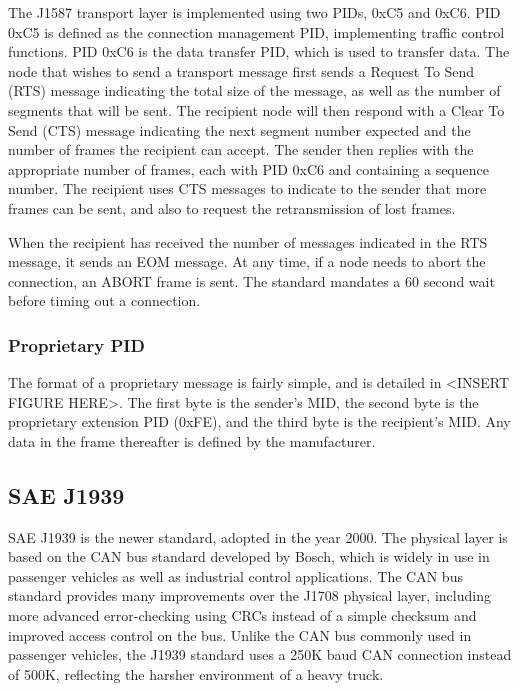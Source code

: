 The J1587 transport layer is implemented using two PIDs, 0xC5 and 0xC6. PID 0xC5 is defined as the connection management PID, implementing traffic control
functions. PID 0xC6 is the data transfer PID, which is used to transfer data. The node that wishes to send a transport message first sends a Request To Send
(RTS) message indicating the total size of the message, as well as the number of segments that will be sent. The recipient node will then respond with a 
Clear To Send (CTS) message indicating the next segment number expected and the number of frames the recipient can accept. The sender then replies with
the appropriate number of frames, each with PID 0xC6 and containing a sequence number. The recipient uses CTS messages to indicate to the sender that
more frames can be sent, and also to request the retransmission of lost frames.

When the recipient has received the number of messages indicated in the RTS message, it sends an EOM message. At any time, if a node needs to abort the
connection, an ABORT frame is sent. The standard mandates a 60 second wait before timing out a connection.

\subsubsection{Proprietary PID}

The format of a proprietary message is fairly simple, and is detailed in <INSERT FIGURE HERE>. The first byte is the sender's MID, the second byte is the
proprietary extension PID (0xFE), and the third byte is the recipient's MID. Any data in the frame thereafter is defined by the manufacturer.

\subsection{SAE J1939}

SAE J1939\cite{J1939-71} is the newer standard, adopted in the year 2000. The physical layer is based on the CAN bus standard developed by Bosch, which is widely in use
in passenger vehicles as well as industrial control applications. The CAN bus standard provides many improvements over the J1708 physical layer,
including more advanced error-checking using CRCs instead of a simple checksum and improved access control on the bus. Unlike the CAN bus commonly used in
passenger vehicles, the J1939 standard uses a 250K baud CAN connection instead of 500K, reflecting the harsher environment of a heavy truck.


